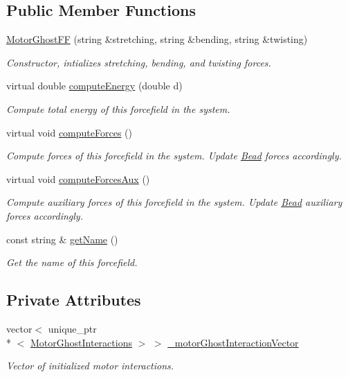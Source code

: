 \subsection*{Public Member Functions}
\begin{DoxyCompactItemize}
\item 
\hyperlink{classMotorGhostFF_a435bb64c8671456da7ede5c7973840d0}{Motor\+Ghost\+F\+F} (string \&stretching, string \&bending, string \&twisting)
\begin{DoxyCompactList}\small\item\em Constructor, intializes stretching, bending, and twisting forces. \end{DoxyCompactList}\item 
virtual double \hyperlink{classMotorGhostFF_a7d5dae6dd5c17aac127f011e96a46ca2}{compute\+Energy} (double d)
\begin{DoxyCompactList}\small\item\em Compute total energy of this forcefield in the system. \end{DoxyCompactList}\item 
virtual void \hyperlink{classMotorGhostFF_a01b47544c29a1147999521d5c9934347}{compute\+Forces} ()
\begin{DoxyCompactList}\small\item\em Compute forces of this forcefield in the system. Update \hyperlink{classBead}{Bead} forces accordingly. \end{DoxyCompactList}\item 
virtual void \hyperlink{classMotorGhostFF_aa51e4998e2276aab855aa5c7cc2ed561}{compute\+Forces\+Aux} ()
\begin{DoxyCompactList}\small\item\em Compute auxiliary forces of this forcefield in the system. Update \hyperlink{classBead}{Bead} auxiliary forces accordingly. \end{DoxyCompactList}\item 
const string \& \hyperlink{classForceField_a4a09e09603b4c4650dc7b3b0f0912fd2}{get\+Name} ()
\begin{DoxyCompactList}\small\item\em Get the name of this forcefield. \end{DoxyCompactList}\end{DoxyCompactItemize}
\subsection*{Private Attributes}
\begin{DoxyCompactItemize}
\item 
vector$<$ unique\+\_\+ptr\\*
$<$ \hyperlink{classMotorGhostInteractions}{Motor\+Ghost\+Interactions} $>$ $>$ \hyperlink{classMotorGhostFF_a4a20d1760dccc1e786c271b6237c0b39}{\+\_\+motor\+Ghost\+Interaction\+Vector}
\begin{DoxyCompactList}\small\item\em Vector of initialized motor interactions. \end{DoxyCompactList}\end{DoxyCompactItemize}


